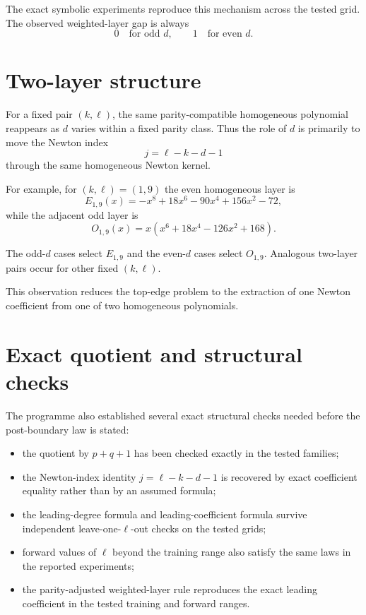 \documentclass[11pt,a4paper]{article}
\begin{document}
The exact symbolic experiments reproduce this mechanism across the tested grid. The observed weighted-layer gap is always
\[
0\quad\text{for odd }d,
\qquad
1\quad\text{for even }d.
\]

\section{Two-layer structure}

For a fixed pair $(k,\ell)$, the same parity-compatible homogeneous polynomial reappears as $d$ varies within a fixed parity class. Thus the role of $d$ is primarily to move the Newton index
\[
j=\ell-k-d-1
\]
through the same homogeneous Newton kernel.

For example, for $(k,\ell)=(1,9)$ the even homogeneous layer is
\begin{equation}
E_{1,9}(x)
=-x^8+18x^6-90x^4+156x^2-72,
\end{equation}
while the adjacent odd layer is
\begin{equation}
O_{1,9}(x)
=x(x^6+18x^4-126x^2+168).
\end{equation}

The odd-$d$ cases select $E_{1,9}$ and the even-$d$ cases select $O_{1,9}$. Analogous two-layer pairs occur for other fixed $(k,\ell)$.

This observation reduces the top-edge problem to the extraction of one Newton coefficient from one of two homogeneous polynomials.

\section{Exact quotient and structural checks}

The programme also established several exact structural checks needed before the post-boundary law is stated:

\begin{itemize}[leftmargin=2em]
\item the quotient by $p+q+1$ has been checked exactly in the tested families;
\item the Newton-index identity $j=\ell-k-d-1$ is recovered by exact coefficient equality rather than by an assumed formula;
\item the leading-degree formula and leading-coefficient formula survive independent leave-one-$\ell$-out checks on the tested grids;
\item forward values of $\ell$ beyond the training range also satisfy the same laws in the reported experiments;
\item the parity-adjusted weighted-layer rule reproduces the exact leading coefficient in the tested training and forward ranges.
\end{itemize}
\end{document}
